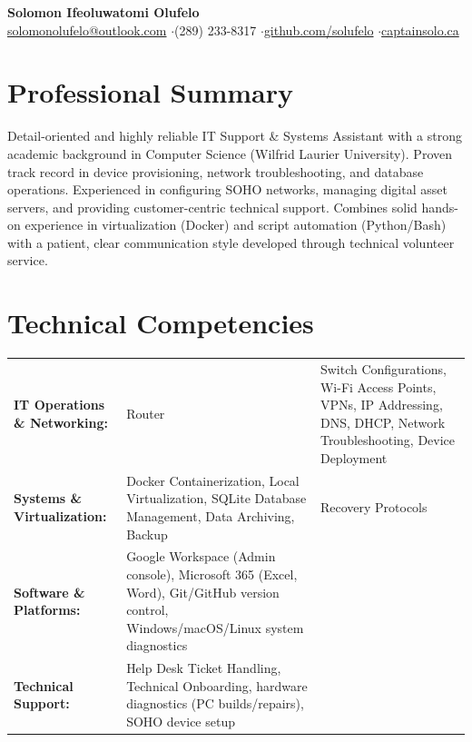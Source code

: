 \documentclass[a4paper,10pt]{article}
\begin{document}
\begin{center}
    {\LARGE \textbf{Solomon Ifeoluwatomi Olufelo}} \\[2pt]
    \href{mailto:solomonolufelo@outlook.com}{solomonolufelo@outlook.com} \enspace$\cdot$\enspace (289) 233-8317 \enspace$\cdot$\enspace \href{https://github.com/solufelo}{github.com/solufelo} \enspace$\cdot$\enspace \href{https://captainsolo.ca}{captainsolo.ca}
\end{center}

\section*{Professional Summary}
Detail-oriented and highly reliable IT Support & Systems Assistant with a strong academic background in Computer Science (Wilfrid Laurier University). Proven track record in device provisioning, network troubleshooting, and database operations. Experienced in configuring SOHO networks, managing digital asset servers, and providing customer-centric technical support. Combines solid hands-on experience in virtualization (Docker) and script automation (Python/Bash) with a patient, clear communication style developed through technical volunteer service.

\section*{Technical Competencies}
\begin{tabularx}{\textwidth}{@{}lX@{}}
\textbf{IT Operations \& Networking:} & Router & Switch Configurations, Wi-Fi Access Points, VPNs, IP Addressing, DNS, DHCP, Network Troubleshooting, Device Deployment \\
\textbf{Systems \& Virtualization:} & Docker Containerization, Local Virtualization, SQLite Database Management, Data Archiving, Backup & Recovery Protocols \\
\textbf{Software \& Platforms:} & Google Workspace (Admin console), Microsoft 365 (Excel, Word), Git/GitHub version control, Windows/macOS/Linux system diagnostics \\
\textbf{Technical Support:} & Help Desk Ticket Handling, Technical Onboarding, hardware diagnostics (PC builds/repairs), SOHO device setup \\
\end{tabularx}
\end{document}
